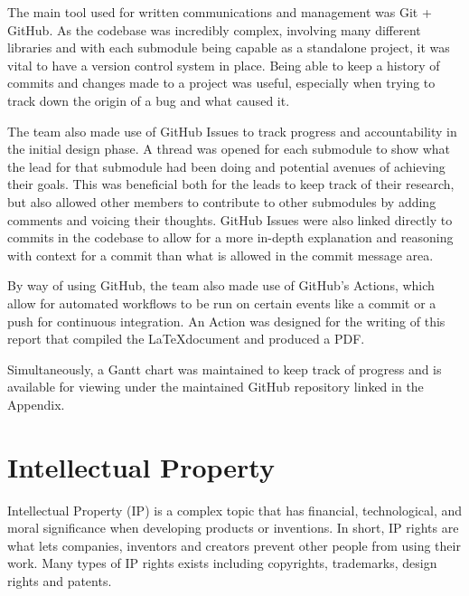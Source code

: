 \documentclass[a4paper]{article}
\begin{document}
The main tool used for written communications and management was Git + GitHub.
As the codebase was incredibly complex, 
involving many different libraries and with each submodule being capable as a
standalone project, it was vital to have a version control system in place. 
Being able to keep a history of commits and changes made to a project was useful,
especially when trying to track down the origin of a bug and what caused it. 

The team also made use of GitHub Issues to track progress and accountability in 
the initial design phase. A thread was opened for each submodule to show what 
the lead for that submodule had been doing and potential avenues of achieving 
their goals. This was beneficial both for the leads to keep track of their 
research, but also allowed other members to contribute to other submodules 
by adding comments and voicing their thoughts. GitHub Issues were also linked 
directly to commits in the codebase to allow for a more in-depth explanation and
reasoning with context for a commit than what is allowed in the commit message 
area. 

By way of using GitHub, the team also made use of GitHub's Actions, which allow 
for automated workflows to be run on certain events like a commit or a push for 
continuous integration. An Action was designed for the writing of this report
that compiled the \LaTeX document and produced a PDF. 

Simultaneously, a Gantt chart was maintained to keep track of progress and is 
available for viewing under the maintained GitHub repository linked in the Appendix.

\section{Intellectual Property}
Intellectual Property (IP) is a complex topic that has financial, technological, 
and moral significance when developing products or inventions. In short, IP rights are what
lets companies, inventors and creators prevent other people from using their work\cite{perea}.
Many types of IP rights exists including copyrights, trademarks, design rights and patents.  
\end{document}
